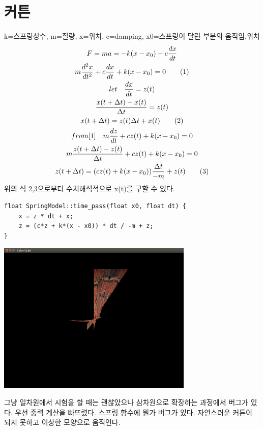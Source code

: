 \documentclass[12pt,a4paper]{article}
\begin{document}
\section{커튼}
k=스프링상수, m=질량, x=위치, c=damping, x0=스프링이 달린 부분의 움직임,위치
\begin{gather*}
F = ma = -k(x-x_0) - c \frac{dx}{dt}\\
m\frac{d^2x}{dt^2} + c\frac{dx}{dt} + k(x - x_0) = 0\label{1}\tag{1}\\
let \quad \frac{dx}{dt} = z(t) \\
\frac{x(t + \Delta t)-x(t)}{\Delta t} = z(t)\\
x(t+\Delta t) = z(t)\Delta t + x(t) \tag{2}\\
from \eqref{1}\quad m\frac{dz}{dt} + cz(t) + k(x-x_0) = 0\\
m\frac{z(t+\Delta t)-z(t)}{\Delta t} + cz(t) + k(x-x_0)=0\\
z(t+\Delta t) = (cz(t) + k(x-x_0))\frac{\Delta t}{-m} +z(t)\tag{3}
\end{gather*}
위의 식 2,3으로부터 수치해석적으로 x(t)를 구할 수 있다.
\begin{lstlisting}
float SpringModel::time_pass(float x0, float dt) {
	x = z * dt + x;
	z = (c*z + k*(x - x0)) * dt / -m + z;
}
\end{lstlisting}



\includegraphics[width=0.7\textwidth]{1.png}

그냥 일차원에서 시험을 할 때는 괜찮았으나 삼차원으로 확장하는 과정에서 버그가 있다.
우선 중력 계산을 빠뜨렸다.
스프링 함수에 뭔가 버그가 있다. 
자연스러운 커튼이 되지 못하고 이상한 모양으로 움직인다.
\end{document}
